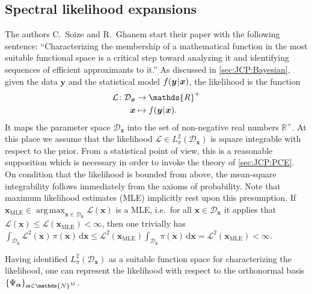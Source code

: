 \subsection{Spectral likelihood expansions} \label{sec:JCP:SLE:SLE}
The authors C.\ Soize and R.\ Ghanem start their paper \cite{PCE:Soize2004} with the following sentence:
``Characterizing the membership of a mathematical function in the most suitable functional space is a critical step toward analyzing it and identifying sequences of efficient approximants to it.''
As discussed in \cref{sec:JCP:Bayesian}, given the data \(\bm{y}\) and the statistical model \(f(\bm{y} {\:\!}|{\:\!} \bm{x})\), the likelihood is the function
\begin{equation} \label{eq:JCP:SLE:LikelihoodFunction}
  \begin{aligned}
    \mathcal{L} \colon \mathcal{D}_{\bm{x}} &\rightarrow \mathds{R}^{+} \\
    \bm{x} &\mapsto f(\bm{y} \cond \bm{x}).
  \end{aligned}
\end{equation}
It maps the parameter space \(\mathcal{D}_{\bm{x}}\) into the set of non-negative real numbers \(\mathds{R}^+\).
At this place we assume that the likelihood \(\mathcal{L} \in L_{\pi}^2(\mathcal{D}_{\bm{x}})\) is square integrable with respect to the prior.
From a statistical point of view, this is a reasonable supposition which is necessary in order to invoke the theory of \cref{sec:JCP:PCE}.
On condition that the likelihood is bounded from above, the mean-square integrability follows immediately from the axioms of probability.
Note that maximum likelihood estimates (MLE) implicitly rest upon this presumption.
If \(\bm{x}_{\mathrm{MLE}} \in \operatorname*{arg\,max}_{\bm{x} \in \mathcal{D}_{\bm{x}}} \mathcal{L}(\bm{x})\) is a MLE,
i.e.\ for all \(\bm{x} \in \mathcal{D}_{\bm{x}}\) it applies that \(\mathcal{L}(\bm{x}) \leq \mathcal{L}(\bm{x}_{\mathrm{MLE}}) < \infty\), then one trivially has
\(\int_{\mathcal{D}_{\bm{x}}} \mathcal{L}^2(\bm{x}) \, \pi(\bm{x}) \, \mathrm{d} \bm{x}
\leq \mathcal{L}^2(\bm{x}_{\mathrm{MLE}}) \int_{\mathcal{D}_{\bm{x}}} \pi(\bm{x}) \, \mathrm{d} \bm{x} = \mathcal{L}^2(\bm{x}_{\mathrm{MLE}})< \infty\).
\par %
Having identified \(L_{\pi}^2(\mathcal{D}_{\bm{x}})\) as a suitable function space for characterizing the likelihood,
one can represent the likelihood with respect to the orthonormal basis \(\{\basis_{\bm{\alpha}}\}_{\bm{\alpha} \in \mathds{N}^\dimParam}\).

